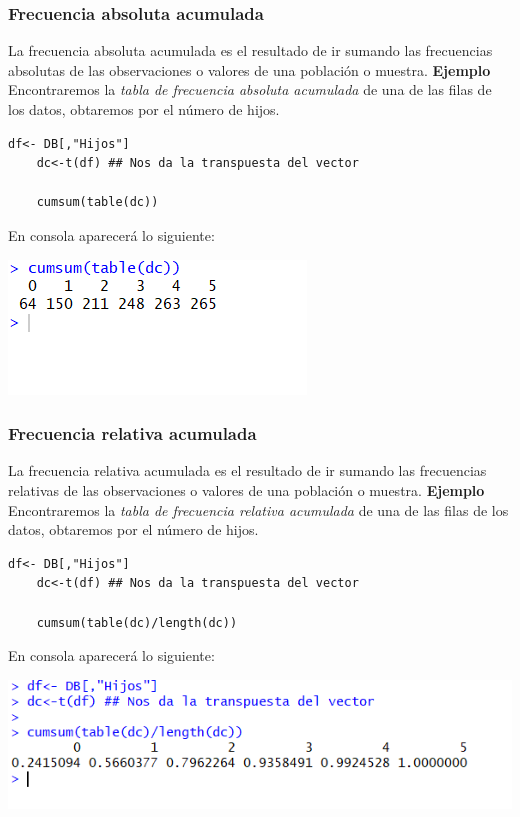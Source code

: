 \documentclass[12pt,hidelinks]{article}
\begin{document}
	\subsubsection{Frecuencia absoluta acumulada}
	La frecuencia absoluta acumulada es el resultado de ir sumando las frecuencias absolutas de las observaciones o valores de una población o muestra. \textbf{Ejemplo} Encontraremos la \textit{tabla de frecuencia absoluta acumulada} de una de las filas de los datos, obtaremos por el número de hijos.
	\begin{lstlisting}[frame=single]
	df<- DB[,"Hijos"]
	dc<-t(df) ## Nos da la transpuesta del vector
	
	cumsum(table(dc))
	\end{lstlisting}
	En consola aparecerá lo siguiente:
	\begin{center}
		\includegraphics[]{TFabsolutaAcum.PNG}
	\end{center}
	\subsubsection{Frecuencia relativa acumulada}
	La frecuencia relativa acumulada es el resultado de ir sumando las frecuencias relativas de las observaciones o valores de una población o muestra. \textbf{Ejemplo} Encontraremos la \textit{tabla de frecuencia relativa acumulada} de una de las filas de los datos, obtaremos por el número de hijos.
	\begin{lstlisting}[frame=single]
	df<- DB[,"Hijos"]
	dc<-t(df) ## Nos da la transpuesta del vector
	
	cumsum(table(dc)/length(dc))
	\end{lstlisting}
	En consola aparecerá lo siguiente:
	\begin{center}
		\includegraphics[width=\linewidth]{TFrelativaAcum.PNG}
	\end{center}
	\newpage
\end{document}
